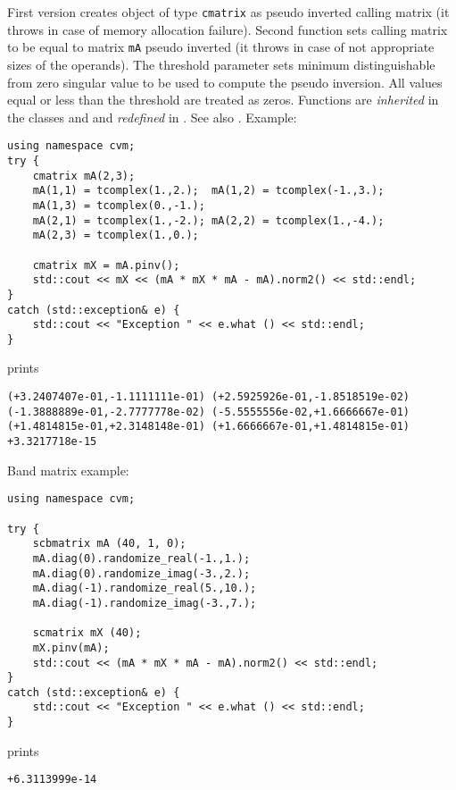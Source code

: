 First version creates  object of type \verb"cmatrix" as
 pseudo inverted calling matrix
(it throws 
in case of memory allocation failure).
Second function sets  calling matrix to be equal to  matrix
\verb"mA" pseudo inverted
(it throws 
in case of not appropriate sizes of the operands).
The threshold parameter sets  minimum distinguishable
from zero singular value to be used to compute the pseudo inversion.
All values equal or less than the threshold are treated as zeros.
Functions are \emph{inherited} in the classes
 and 
and \emph{redefined} in .
See also .
Example:
\begin{Verbatim}
using namespace cvm;
try {
    cmatrix mA(2,3);
    mA(1,1) = tcomplex(1.,2.);  mA(1,2) = tcomplex(-1.,3.); 
    mA(1,3) = tcomplex(0.,-1.);
    mA(2,1) = tcomplex(1.,-2.); mA(2,2) = tcomplex(1.,-4.); 
    mA(2,3) = tcomplex(1.,0.);

    cmatrix mX = mA.pinv();
    std::cout << mX << (mA * mX * mA - mA).norm2() << std::endl;
}
catch (std::exception& e) {
    std::cout << "Exception " << e.what () << std::endl;
}
\end{Verbatim}
prints
\begin{Verbatim}
(+3.2407407e-01,-1.1111111e-01) (+2.5925926e-01,-1.8518519e-02)
(-1.3888889e-01,-2.7777778e-02) (-5.5555556e-02,+1.6666667e-01)
(+1.4814815e-01,+2.3148148e-01) (+1.6666667e-01,+1.4814815e-01)
+3.3217718e-15
\end{Verbatim}
Band matrix example:
\begin{Verbatim}
using namespace cvm;

try {
    scbmatrix mA (40, 1, 0);
    mA.diag(0).randomize_real(-1.,1.);
    mA.diag(0).randomize_imag(-3.,2.);
    mA.diag(-1).randomize_real(5.,10.);
    mA.diag(-1).randomize_imag(-3.,7.);

    scmatrix mX (40);
    mX.pinv(mA);
    std::cout << (mA * mX * mA - mA).norm2() << std::endl;
}
catch (std::exception& e) {
    std::cout << "Exception " << e.what () << std::endl;
}
\end{Verbatim}
prints
\begin{Verbatim}
+6.3113999e-14
\end{Verbatim}
\newpage




